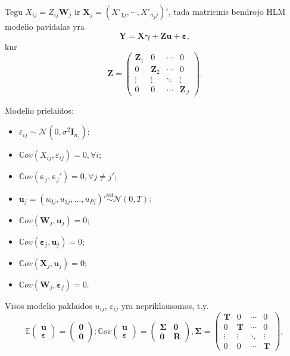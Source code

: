 \documentclass[12pt,a4paper]{article}
\begin{document}
Tegu $X_{ij}=Z_{ij}\mathbf{W}_j$ ir $\mathbf{X}_j = (X'_{1j}, \cdots, X'_{n_jj})'$, tada matricinis bendrojo HLM modelio pavidalas yra
\begin{equation} \label{eq:bendrasHLM}
\mathbf{Y}=\mathbf{X}\boldsymbol{\gamma}+\mathbf{Z}\mathbf{u}+\boldsymbol{\varepsilon},
\end{equation}
kur
\[
\mathbf{Z}=
\begin{pmatrix}
\mathbf{Z}_1 & 0 & \cdots & 0 \\
0 & \mathbf{Z}_2 & \cdots & 0\\
\vdots & \vdots & \ddots & \vdots \\
0&0 & \cdots & \mathbf{Z}_J
\end{pmatrix}.
\]

\noindent Modelio prielaidos:
\begin{itemize}
\item $\varepsilon_{ij} \sim \mathcal{N}(0, \sigma^2\mathbf{I}_{n_j})$;
\item $\mathbb{C}ov(X_{ij},\varepsilon_{ij})=0, \forall i$;
\item $\mathbb{C}ov(\boldsymbol{\varepsilon}_j,\boldsymbol{\varepsilon}_j')=0, \forall j\neq j'$;
\item $\mathbf{u}_j = (u_{0j}, u_{1j}, \dots, u_{Pj})' \overset{iid}{\sim} \mathcal{N}(0,T)$;
\item $\mathbb{C}ov(\mathbf{W}_{j}, \mathbf{u}_j)=0$;
\item $\mathbb{C}ov(\boldsymbol{\varepsilon}_j, \mathbf{u}_j)=0$;
\item $\mathbb{C}ov(\mathbf{X}_j, \mathbf{u}_j)=0$;
\item $\mathbb{C}ov(\mathbf{W}_j, \boldsymbol{\varepsilon}_j)=0$.
\end{itemize}
Visos modelio paklaidos $u_{ij}$, $\varepsilon_{ij}$ yra nepriklausomos, t.y.
\[\mathbb{E}\begin{pmatrix}
\mathbf{u} \\
\boldsymbol{\varepsilon}
\end{pmatrix}=
\begin{pmatrix}
\mathbf{0} \\
\mathbf{0}
\end{pmatrix};
\mathbb{C}ov\begin{pmatrix}
\mathbf{u} \\
\boldsymbol{\varepsilon}
\end{pmatrix}=
\begin{pmatrix}
\mathbf{\Sigma}&\mathbf{0} \\
\mathbf{0}&\mathbf{R}
\end{pmatrix},
\mathbf{\Sigma}=
\begin{pmatrix}
\mathbf{T} & 0 & \cdots & 0 \\
0 & \mathbf{T} & \cdots & 0\\
\vdots & \vdots & \ddots & \vdots \\
0&0 & \cdots & \mathbf{T}
\end{pmatrix},
\]
\end{document}
